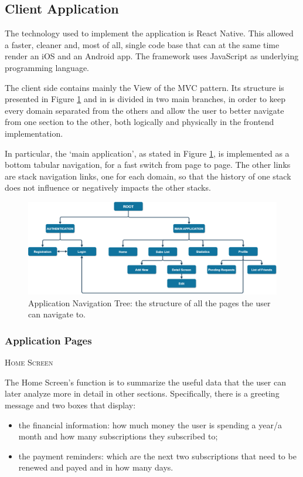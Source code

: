 \documentclass[11pt]{article}
\begin{document}
\subsection{Client Application}
The technology used to implement the application is React Native. This allowed a faster, cleaner and, most of all, single code base that can at the same time render an iOS and an Android app. The framework uses JavaScript as underlying programming language.

The client side contains mainly the View of the MVC pattern. Its structure is presented in Figure \ref{fig:navigationTree} and in is divided in two main branches, in order to keep every domain separated from the others and allow the user to better navigate from one section to the other, both logically and physically in the frontend implementation.

In particular, the `main application', as stated in Figure \ref{fig:navigationTree}, is implemented as a bottom tabular navigation, for a fast switch from page to page. The other links are stack navigation links, one for each domain, so that the history of one stack does not influence or negatively impacts the other stacks.

\begin{figure}[h!]
    \begin{center}
        \includegraphics[width=\textwidth, clip]{../../assets/navigationTree.drawio.png}
    \end{center}
    \caption{Application Navigation Tree: the structure of all the pages the user can navigate to.}
    \label{fig:navigationTree}
\end{figure}

\subsubsection{Application Pages}
{\scshape{Home Screen}}
\vspace{0.2cm}

\noindent The Home Screen's function is to summarize the useful data that the user can later analyze more in detail in other sections. Specifically, there is a greeting message and two boxes that display: \begin{itemize}
    \item the financial information: how much money the user is spending a year/a month and how many subscriptions they subscribed to;
    \item the payment reminders: which are the next two subscriptions that need to be renewed and payed and in how many days.
\end{itemize}
\end{document}
